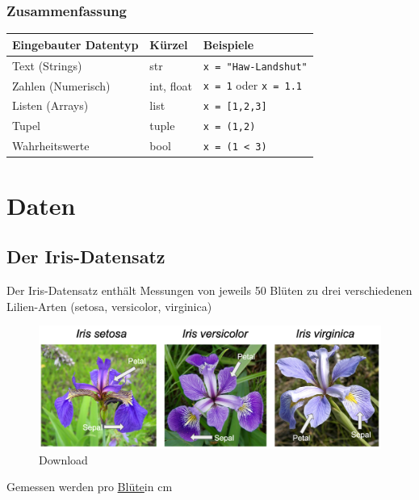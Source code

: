 \documentclass[
  oneside]{book}
\begin{document}
\hypertarget{zusammenfassung}{%
\subsection{Zusammenfassung}\label{zusammenfassung}}

\begin{longtable}[]{@{}lll@{}}
\toprule
Eingebauter Datentyp & Kürzel & Beispiele \\
\midrule
\endhead
Text (Strings) & str & \texttt{x\ =\ "Haw-Landshut"} \\
Zahlen (Numerisch) & int, float & \texttt{x\ =\ 1} oder \texttt{x\ =\ 1.1} \\
Listen (Arrays) & list & \texttt{x\ =\ {[}1,2,3{]}} \\
Tupel & tuple & \texttt{x\ =\ (1,2)} \\
Wahrheitswerte & bool & \texttt{x\ =\ (1\ \textless{}\ 3)} \\
\bottomrule
\end{longtable}

\hypertarget{daten}{%
\chapter{Daten}\label{daten}}

\hypertarget{der-iris-datensatz}{%
\section{Der Iris-Datensatz}\label{der-iris-datensatz}}

Der Iris-Datensatz enthält Messungen von jeweils 50 Blüten zu drei verschiedenen Lilien-Arten (setosa, versicolor, virginica)

\begin{figure}
\centering
\includegraphics{assets/daten.assets/Download.png}
\caption{Download}
\end{figure}

Gemessen werden pro \href{https://de.wikipedia.org/wiki/Bl\%C3\%BCte}{Blüte}in cm 
\end{document}
